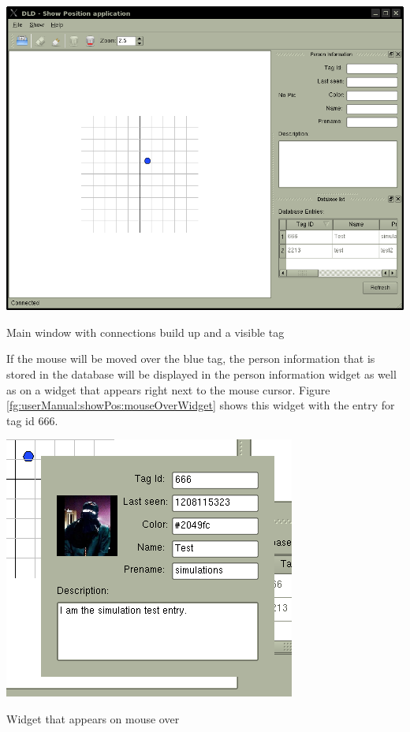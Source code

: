   \begin{staticFigure}
   \begin{center}
     \includegraphics[scale=0.55]{images/UserManual/showPos/afterConnection2GenPos-Tag.png}
     \caption{Main window with connections build up and a visible tag}
     \label{fg:userManual:showPos:mainWindowConnectedOneTag}
   \end{center}
  \end{staticFigure}

  If the mouse will be moved over the blue tag, the person information that is stored in the database will be displayed in the person information widget as well as on a widget that appears right next to the mouse cursor. Figure \ref{fg:userManual:showPos:mouseOverWidget} shows this widget with the entry for tag id 666.

  \begin{staticFigure}
   \begin{center}
     \includegraphics{images/UserManual/showPos/tagOnMouseOver.png}
     \caption{Widget that appears on mouse over}
     \label{fg:userManual:showPos:mouseOverWidget}
   \end{center}
  \end{staticFigure}

